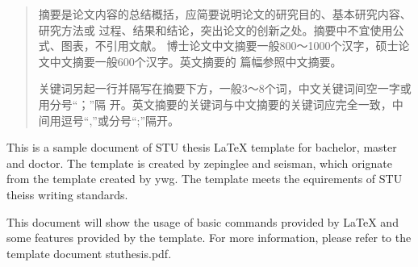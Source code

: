 

\begin{abstract}
  摘要是论文内容的总结概括，应简要说明论文的研究目的、基本研究内容、 研究方法或
  过程、结果和结论，突出论文的创新之处。摘要中不宜使用公式、图表，不引用文献。
  博士论文中文摘要一般800～1000个汉字，硕士论文中文摘要一般600个汉字。英文摘要的
  篇幅参照中文摘要。

  关键词另起一行并隔写在摘要下方，一般3～8个词，中文关键词间空一字或用分号“；”隔
  开。英文摘要的关键词与中文摘要的关键词应完全一致，中间用逗号“,”或分号“;”隔开。

\end{abstract}

\begin{abstract*}
  This is a sample document of STU thesis \LaTeX{} template for bachelor,
  master and doctor. The template is created by zepinglee and seisman, which
  orignate from the template created by ywg. The template meets the
  equirements of STU theiss writing standards.

  This document will show the usage of basic commands provided by \LaTeX{} and
  some features provided by the template. For more information, please refer to
  the template document stuthesis.pdf.

\end{abstract*}
